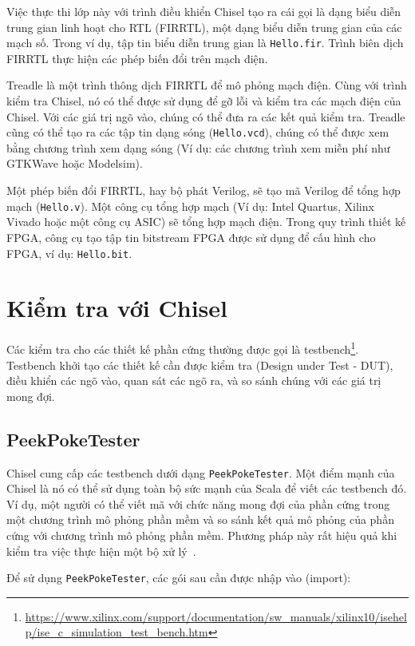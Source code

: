 \documentclass[%
    10pt,
    headinclude, footexclude,
    openright, %
    notitlepage,
    cleardoubleempty,
    headsepline,
    pointlessnumbers,
    bibtotoc, idxtotoc,
    ]{scrbook}
\newcommand{\code}[1]{{\small{\texttt{#1}}}}
\newcommand{\myref}[2]{\href{#1}{#2}}
\renewcommand{\myref}[2]{{#2}{\footnote{\url{#1}}}}
\begin{document}
Việc thực thi lớp này với trình điều khiển Chisel tạo ra cái gọi là dạng biểu diễn trung gian linh hoạt cho RTL (FIRRTL), 
một dạng biểu diễn trung gian của các mạch số. Trong ví dụ, tập tin biểu diễn trung gian là \code{Hello.fir}. 
Trình biên dịch FIRRTL thực hiện các phép biến đổi trên mạch điện.

Treadle là một trình thông dịch FIRRTL để mô phỏng mạch điện. Cùng với trình kiểm tra Chisel, 
nó có thể được sử dụng để gỡ lỗi và kiểm tra các mạch điện của Chisel. Với các giá trị ngõ vào, chúng có thể đưa ra các
kết quả kiểm tra. Treadle cũng có thể tạo ra các tập tin dạng sóng (\code{Hello.vcd}), chúng có thể được xem bằng 
chương trình xem dạng sóng (Ví dụ: các chương trình xem miễn phí như GTKWave hoặc Modelsim).

Một phép biến đổi FIRRTL, hay bộ phát Verilog, sẽ tạo mã Verilog để tổng hợp mạch (\code{Hello.v}). 
Một công cụ tổng hợp mạch (Ví dụ: Intel Quartus, Xilinx Vivado hoặc một công cụ ASIC) sẽ tổng hợp mạch điện.
Trong quy trình thiết kế FPGA, công cụ tạo tập tin bitstream FPGA được sử dụng để cấu hình cho FPGA, ví dụ: \code{Hello.bit}.

\section{Kiểm tra với Chisel}


Các kiểm tra cho các thiết kế phần cứng thường được gọi là \myref{https://www.xilinx.com/support/documentation/sw_manuals/xilinx10/isehelp/ise_c_simulation_test_bench.htm}{testbench}.
Testbench khởi tạo các thiết kế cần được kiểm tra (Design under Test - DUT), điều khiển các ngõ vào, quan sát các ngõ ra,
và so sánh chúng với các giá trị mong đợi.

\subsection{PeekPokeTester}

Chisel cung cấp các testbench dưới dạng \code{PeekPokeTester}.
Một điểm mạnh của Chisel là nó có thể sử dụng toàn bộ sức mạnh của Scala để viết
các testbench đó. Ví dụ, một người có thể viết mã với chức năng mong đợi của phần cứng 
trong một chương trình mô phỏng phần mềm và so sánh kết quả mô phỏng của phần cứng với chương trình mô phỏng
phần mềm. Phương pháp này rất hiệu quả khi kiểm tra việc thực hiện một bộ xử lý~\cite{lipsi:arcs2018}.

Để sử dụng \code{PeekPokeTester}, các gói sau cần được nhập vào (import):
\end{document}
